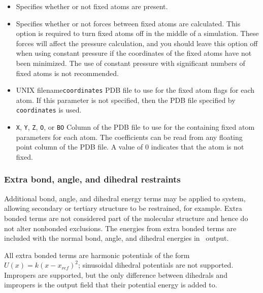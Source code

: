 \begin{itemize}

\item
{}
{Specifies whether or not fixed atoms are present.} 

\item
{}
{Specifies whether or not forces between fixed atoms are calculated.  This option is required to turn fixed atoms off in the middle of a simulation.
These forces will affect the pressure calculation, and you should leave this option off when using constant pressure if the coordinates of the fixed atoms have not been minimized.
The use of constant pressure with significant numbers of fixed atoms is not recommended.}

\item
{}
{UNIX filename}{{\tt coordinates}}
{PDB file to use for the fixed atom flags for each atom.  
If this parameter is not specified, then 
the PDB file specified by {\tt coordinates} is used.}

\item
{}
{{\tt X}, {\tt Y}, {\tt Z}, {\tt O}, or {\tt B}}{{\tt O}} 
{Column of the PDB file to use for the containing fixed atom parameters for 
each atom.  The coefficients can be read from any 
floating point column of the PDB file.  
A value of 0 indicates that the atom is not fixed.}

\end{itemize}

\subsubsection{Extra bond, angle, and dihedral restraints}

Additional bond, angle, and dihedral energy terms may be applied to system,
allowing secondary or tertiary structure to be restrained, for example.
Extra bonded terms are not considered part of the molecular structure
and hence do not alter nonbonded exclusions.
The energies from extra bonded terms are included with the normal
bond, angle, and dihedral energies in \NAMD\ output.

All extra bonded terms are harmonic potentials of the form
$U(x) = k (x-x_{ref})^2$;
sinusoidal dihedral potentials are not supported.
Impropers are supported, but the only difference between dihedrals and
impropers is the output field that their potential energy is added to.


